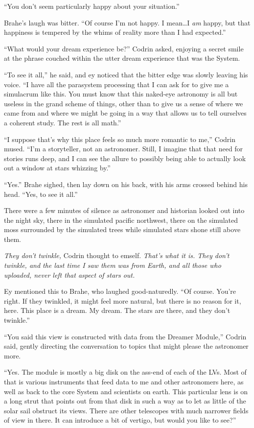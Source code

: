``You don't seem particularly happy about your situation.''

Brahe's laugh was bitter. ``Of course I'm not happy. I mean\ldots I \emph{am} happy, but that happiness is tempered by the whims of reality more than I had expected.''

``What would your dream experience be?'' Codrin asked, enjoying a secret smile at the phrase couched within the utter dream experience that was the System.

``To see it all,'' he said, and ey noticed that the bitter edge was slowly leaving his voice. ``I have all the parasystem processing that I can ask for to give me a simulacrum like this. You must know that this naked-eye astronomy is all but useless in the grand scheme of things, other than to give us a sense of where we came from and where we might be going in a way that allows us to tell ourselves a coherent study. The rest is all math.''

``I suppose that's why this place feels so much more romantic to me,'' Codrin mused. ``I'm a storyteller, not an astronomer. Still, I imagine that that need for stories runs deep, and I can see the allure to possibly being able to actually look out a window at stars whizzing by.''

``Yes.'' Brahe sighed, then lay down on his back, with his arms crossed behind his head. ``Yes, to see it all.''

There were a few minutes of silence as astronomer and historian looked out into the night sky, there in the simulated pacific northwest, there on the simulated moss surrounded by the simulated trees while simulated stars shone still above them.

\emph{They don't twinkle,} Codrin thought to emself. \emph{That's what it is. They don't twinkle, and the last time I saw them was from Earth, and all those who uploaded, never left that aspect of stars out.}

Ey mentioned this to Brahe, who laughed good-naturedly. ``Of course. You're right. If they twinkled, it might feel more natural, but there is no reason for it, here. This place is a dream. My dream. The stars are there, and they don't twinkle.''

``You said this view is constructed with data from the Dreamer Module,'' Codrin said, gently directing the conversation to topics that might please the astronomer more.

``Yes. The module is mostly a big disk on the ass-end of each of the LVs. Most of that is various instruments that feed data to me and other astronomers here, as well as back to the core System and scientists on earth. This particular lens is on a long strut that points out from that disk in such a way as to let as little of the solar sail obstruct its views. There are other telescopes with much narrower fields of view in there. It can introduce a bit of vertigo, but would you like to see?''

